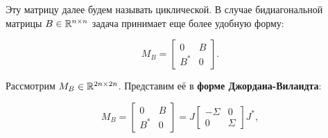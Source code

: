Эту матрицу далее будем называть циклической. В случае бидиагональной матрицы \( B \in \mathbb{R}^{n \times n} \) задача принимает еще более удобную форму:

\begin{equation}
M_B = \begin{bmatrix} 0 & B \\ B^* & 0 \end{bmatrix}.
\end{equation}







Рассмотрим \(M_B \in \mathbb{R}^{2n \times 2n}\). Представим её в \textbf{форме Джордана-Виландта}:

\begin{equation} \label{D-V-eigen}
    M_B= \begin{bmatrix}
        0 & B \\
        B^* & 0
    \end{bmatrix} = J
    \begin{bmatrix}
        -\Sigma & 0 \\
        0 & \Sigma
    \end{bmatrix} J^*,
\end{equation}

